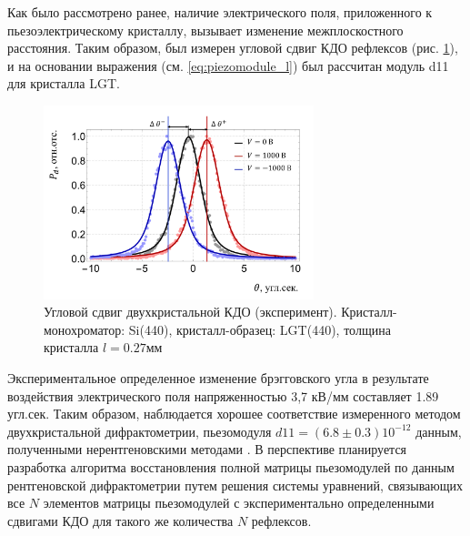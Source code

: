 Как было рассмотрено ранее, наличие электрического поля, приложенного
к пьезоэлектрическому кристаллу, вызывает изменение межплоскостного расстояния.
Таким образом, был измерен угловой сдвиг КДО рефлексов (рис. \ref{ris:d11_experiment}), и на основании выражения
 (см. \ref{eq:piezomodule_l}) был рассчитан модуль d11 для кристалла LGT.

\begin{figure}[H]
  \centering
  \includegraphics[width=0.7\textwidth]{images/peak_shift_1000v.png}
  \caption{Угловой сдвиг двухкристальной КДО (эксперимент). Кристалл-монохроматор: Si(440),
  кристалл-образец: LGT(440), толщина кристалла $l = 0.27мм$ }
  \label{ris:d11_experiment}
\end{figure}

Экспериментальное определенное изменение брэгговского угла в результате воздействия
электрического поля напряженностью 3,7 кВ/мм составляет 1.89 угл.сек. Таким образом,
наблюдается хорошее соответствие измеренного методом двухкристальной дифрактометрии,
 пьезомодуля $d11 = (6.8 \pm 0.3 ) 10^{-12}$ данным, полученными
  нерентгеновскими методами \cite{LGT_piezo_d11}. В перспективе
  планируется разработка алгоритма восстановления полной матрицы пьезомодулей
  по данным рентгеновской дифрактометрии путем решения системы уравнений, связывающих все $N$
  элементов матрицы пьезомодулей с экспериментально определенными сдвигами КДО для
  такого же количества $N$ рефлексов.
